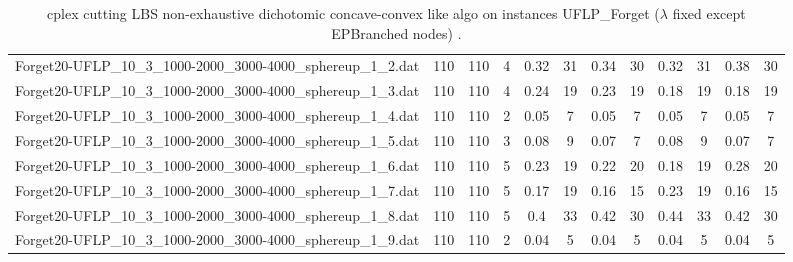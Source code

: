 \begin{sidewaystable}[!ht]
{\begin{tabular}{lccccccccccc}
Forget20-UFLP\_10\_3\_1000-2000\_3000-4000\_sphereup\_1\_2.dat & 110 & 110 & 4 &  \textcolor{blue2}{0.32} & 31 & 0.34 & 30 &  \textcolor{blue2}{0.32} & 31 & 0.38 & 30 \\
Forget20-UFLP\_10\_3\_1000-2000\_3000-4000\_sphereup\_1\_3.dat & 110 & 110 & 4 & 0.24 & 19 & 0.23 & 19 &  \textcolor{blue2}{0.18} & 19 &  \textcolor{blue2}{0.18} & 19 \\
Forget20-UFLP\_10\_3\_1000-2000\_3000-4000\_sphereup\_1\_4.dat & 110 & 110 & 2 &  \textcolor{blue2}{0.05} & 7 &  \textcolor{blue2}{0.05} & 7 &  \textcolor{blue2}{0.05} & 7 &  \textcolor{blue2}{0.05} & 7 \\
Forget20-UFLP\_10\_3\_1000-2000\_3000-4000\_sphereup\_1\_5.dat & 110 & 110 & 3 & 0.08 & 9 &  \textcolor{blue2}{0.07} & 7 & 0.08 & 9 &  \textcolor{blue2}{0.07} & 7 \\
Forget20-UFLP\_10\_3\_1000-2000\_3000-4000\_sphereup\_1\_6.dat & 110 & 110 & 5 & 0.23 & 19 & 0.22 & 20 &  \textcolor{blue2}{0.18} & 19 & 0.28 & 20 \\
Forget20-UFLP\_10\_3\_1000-2000\_3000-4000\_sphereup\_1\_7.dat & 110 & 110 & 5 & 0.17 & 19 &  \textcolor{blue2}{0.16} & 15 & 0.23 & 19 &  \textcolor{blue2}{0.16} & 15 \\
Forget20-UFLP\_10\_3\_1000-2000\_3000-4000\_sphereup\_1\_8.dat & 110 & 110 & 5 & 0.4 & 33 & 0.42 & 30 & 0.44 & 33 & 0.42 & 30 \\
Forget20-UFLP\_10\_3\_1000-2000\_3000-4000\_sphereup\_1\_9.dat & 110 & 110 & 2 &  \textcolor{blue2}{0.04} & 5 &  \textcolor{blue2}{0.04} & 5 &  \textcolor{blue2}{0.04} & 5 &  \textcolor{blue2}{0.04} & 5 \\
\bottomrule
\end{tabular}
}%
\caption{cplex cutting LBS non-exhaustive dichotomic concave-convex like algo on instances UFLP_Forget ($\lambda$ fixed except EPBranched nodes) .}
\end{sidewaystable}
